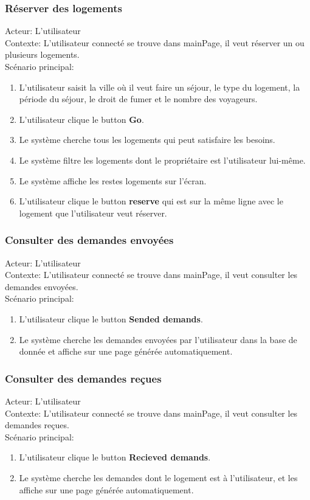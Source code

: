 \documentclass[14px]{article}
\begin{document}
\subsubsection{Réserver des logements}
Acteur: L'utilisateur\\
Contexte: L'utilisateur connecté se trouve dans mainPage, il veut réserver un ou plusieurs logements.\\
Scénario principal:
\begin{enumerate}
	\item L'utilisateur saisit la ville où il veut faire un séjour, le type du logement, la période du séjour, le droit de fumer et le nombre des voyageurs.
	\item L'utilisateur clique le button \textbf{Go}.
	\item Le système cherche tous les logements qui peut satisfaire les besoins.
	\item Le système filtre les logements dont le propriétaire est l'utilisateur lui-même.
	\item Le système affiche les restes logements sur l'écran.
	\item L'utilisateur clique le button \textbf{reserve} qui est sur la même ligne avec le logement que l'utilisateur veut réserver.
\end{enumerate}

\subsubsection{Consulter des demandes envoyées}
Acteur: L'utilisateur\\
Contexte: L'utilisateur connecté se trouve dans mainPage, il veut consulter les demandes envoyées.\\
Scénario principal:
\begin{enumerate}
	\item L'utilisateur clique le button \textbf{Sended demands}.
	\item Le système cherche les demandes envoyées par l'utilisateur dans la base de donnée et affiche sur une page générée automatiquement.
\end{enumerate}

\subsubsection{Consulter des demandes reçues}
Acteur: L'utilisateur\\
Contexte: L'utilisateur connecté se trouve dans mainPage, il veut consulter les demandes reçues.\\
Scénario principal:
\begin{enumerate}
	\item L'utilisateur clique le button \textbf{Recieved demands}.
	\item Le système cherche les demandes dont le logement est à l'utilisateur, et les affiche sur une page générée automatiquement.
\end{enumerate}
\end{document}
